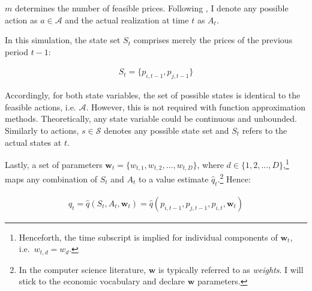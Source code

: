 $m$ determines the number of feasible prices. Following \textcite{sutton_reinforcement_2018}, I denote any possible action as $a \in \mathcal{A}$ and the actual realization at time $t$ as $A_t$.

In this simulation, the state set $S_t$ comprises merely the prices of the previous period $t-1$:

\begin{gather}
S_t = \{ p_{i, t-1}, p_{j, t-1} \}
\end{gather}


Accordingly, for both state variables, the set of possible states is identical to the feasible actions, i.e. $\mathcal{A}$. However, this is not required with function approximation methods. Theoretically, any state variable could be continuous and unbounded. Similarly to actions, $s \in \mathcal{S}$ denotes any possible state set and $S_t$ refers to the actual states at $t$.






Lastly, a set of parameters $\boldsymbol{w}_t = \{w_{t, 1}, w_{t, 2}, ..., w_{t, D}\}$, where $d \in \{1, 2, ..., D\}$,\footnote{Henceforth, the time subscript is implied for individual components of $\boldsymbol{w}_t$, i.e.\ $w_{t,d} = w_d$.} maps any combination of $S_t$ and $A_t$ to a value estimate $\hat{q}_t$.\footnote{In the computer science literature, $\boldsymbol{w}$ is typically referred to as \emph{weights}. I will stick to the economic vocabulary and declare $\boldsymbol{w}$ parameters.} Hence:

\begin{gather}\label{q_estimation}
	\hat{q}_t = \hat{q}(S_t,A_t,\boldsymbol{w}_t) = \hat{q}(p_{i, t-1}, p_{j, t-1}, p_{i, t}, \boldsymbol{w}_t)
\end{gather}

